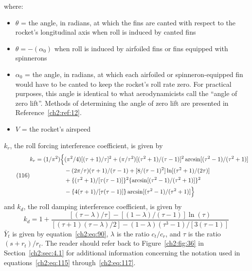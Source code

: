 \noindent where:
\begin{itemize}[leftmargin=0pt,label={}]
  \item $\theta$ = the angle, in radians, at which the fins are canted with respect to the
  rocket's longitudinal axis when roll is induced by canted fins
  \item $\theta = -(\alpha_0)$ when roll is induced by airfoiled fins or fins equipped with
  spinnerons
  \item $\alpha_0$ = the angle, in radians, at which each airfoiled or spinneron-equipped fin
  would have to be canted to keep the rocket's roll rate zero. For practical purposes, this angle
  is identical to what aerodynamicists call the ``angle of zero lift''. Methods of determining the
  angle of zero lift are presented in Reference~\ref{ch2:ref:12}.
  \item $V$ = the rocket's airspeed
\end{itemize}
\noindent $k_r$, the roll forcing interference coefficient, is given by
\begin{equation*}\tag{116}
\begin{split}
k_r = (1/\pi^{2})\Bigl\{&(\pi^{2}/4)[(\tau + 1)/\tau]^{2}
  + (\pi/\tau^{2})[(\tau^{2} + 1)/(\tau - 1)]^{2}\arcsin[(\tau^{2} - 1)/(\tau^{2} + 1)]\\
&- (2\pi/\tau)(\tau + 1)/(\tau - 1) + [8/(\tau - 1)^{2}]\ln[(\tau^{2} + 1)/(2\tau)]\\
&+ \{(\tau^{2} + 1)/[\tau(\tau - 1)]\}^{2}\{\arcsin[(\tau^{2} - 1)/(\tau^{2} + 1)]\}^{2}\\
&- \{4(\tau + 1)/[\tau(\tau - 1)]\}\arcsin[(\tau^{2} - 1)/(\tau^{2} + 1)]\Bigr\}
\end{split}
\end{equation*}
and $k_d$, the roll damping interference coefficient, is given by
\begin{equation*}\tag{117}
k_d = 1 + \frac{[(\tau - \lambda)/\tau] - [(1 - \lambda)/(\tau - 1)]\ln(\tau)}
  {[(\tau + 1)(\tau - \lambda)/2] - (1 - \lambda)(\tau^{3} - 1)/[3(\tau - 1)]}
\end{equation*}
$\bar{Y}_t$ is given by equation~\eqref{ch2:eq:90}, $\lambda$ is the ratio $c_t/c_r$, and $\tau$ is
the ratio $(s + r_t)/r_t$. The reader should refer back to Figure~\ref{ch2:fig:36} in
Section~\ref{ch2:sec:4.1} for additional information concerning the notation used in
equations~\eqref{ch2:eq:115} through~\eqref{ch2:eq:117}.

